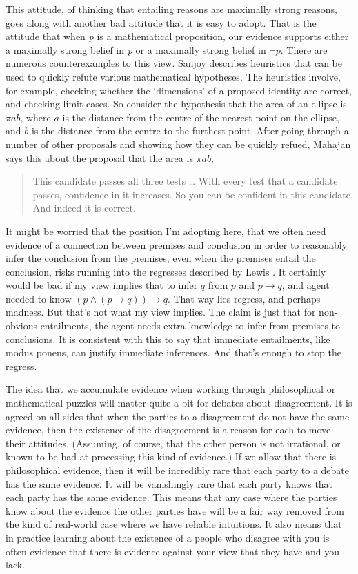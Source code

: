 This attitude, of thinking that entailing reasons are maximally strong reasons, goes along with another bad attitude that it is easy to adopt. That is the attitude that when \emph{p} is a mathematical proposition, our evidence supports either a maximally strong belief in \emph{p} or a maximally strong belief in $\neg p$. There are numerous counterexamples to this view. Sanjoy \citet{Mahajan2010} describes heuristics that can be used to quickly refute various mathematical hypotheses. The heuristics involve, for example, checking whether the `dimensions' of a proposed identity are correct, and checking limit cases. So consider the hypothesis that the area of an ellipse is $\pi ab$, where $a$ is the distance from the centre of the nearest point on the ellipse, and $b$ is the distance from the centre to the furthest point. After going through a number of other proposals and showing how they can be quickly refued, Mahajan says this about the proposal that the area is $\pi ab$,

\begin{quote}
This candidate passes all three tests {\ldots} With every test that a candidate passes, confidence in it increases. So you can be confident in this candidate. And indeed it is correct. ~\citep[21]{Mahajan2010}
\end{quote}
It might be worried that the position I'm adopting here, that we often need evidence of a connection between premises and conclusion in order to reasonably infer the conclusion from the premises, even when the premises entail the conclusion, risks running into the regresses described by Lewis \citet{Carroll1895}. It certainly would be bad if my view implies that to infer $q$ from $p$ and $p \rightarrow q$, and agent needed to know $(p \wedge (p \rightarrow q)) \rightarrow q$. That way lies regress, and perhaps madness. But that's not what my view implies. The claim is just that for non-obvious entailments, the agent needs extra knowledge to infer from premises to conclusions. It is consistent with this to say that immediate entailments, like modus ponens, can justify immediate inferences. And that's enough to stop the regress.

The idea that we accumulate evidence when working through philosophical or mathematical puzzles will matter quite a bit for debates about disagreement. It is agreed on all sides that when the parties to a disagreement do not have the same evidence, then the existence of the disagreement is a reason for each to move their attitudes. (Assuming, of course, that the other person is not irrational, or known to be bad at processing this kind of evidence.) If we allow that there is philosophical evidence, then it will be incredibly rare that each party to a debate has the same evidence. It will be vanishingly rare that each party knows that each party has the same evidence. This means that any case where the parties know about the evidence the other parties have will be a fair way removed from the kind of real-world case where we have reliable intuitions. It also means that in practice learning about the existence of a people who disagree with you is often evidence that there is evidence against your view that they have and you lack.

